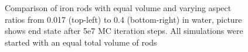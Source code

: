 \begin{figure}[h]
\begin{minipage}[t]{0.3\textwidth}
  \end{minipage}~~~
  \begin{minipage}[t]{0.3\textwidth}
  \end{minipage}~~~
  \begin{minipage}[t]{0.3\textwidth}
  \end{minipage}
  \caption{Comparison of iron rods with equal volume and varying aspect ratios from 0.017 (top-left) to  0.4 (bottom-right) in water, picture shows end state after 5e7 MC iteration steps. All simulations were started with an equal total volume of rods}
  \label{fig:asp_vol}
\end{figure}
\clearpage
